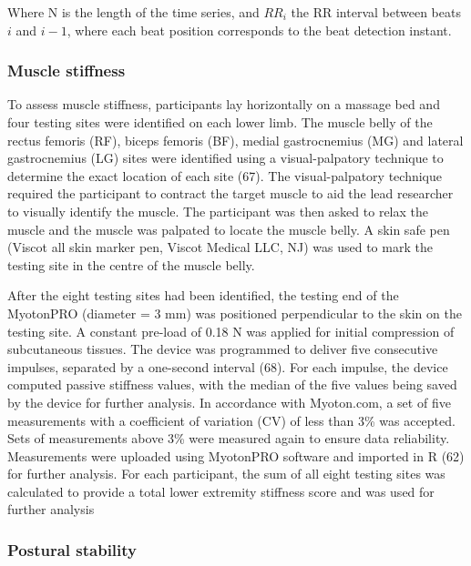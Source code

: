 \documentclass[
  english,
  man]{apa6}
\begin{document}
Where N is the length of the time series, and \(RR_i\) the RR interval between beats \(i\) and \(i-1\), where each beat position corresponds to the beat detection instant.

\hypertarget{muscle-stiffness}{%
\subsubsection{Muscle stiffness}\label{muscle-stiffness}}

To assess muscle stiffness, participants lay horizontally on a massage bed and four testing sites were identified on each lower limb.
The muscle belly of the rectus femoris (RF), biceps femoris (BF), medial gastrocnemius (MG) and lateral gastrocnemius (LG) sites were identified using a visual-palpatory technique to determine the exact location of each site (67).
The visual-palpatory technique required the participant to contract the target muscle to aid the lead researcher to visually identify the muscle.
The participant was then asked to relax the muscle and the muscle was palpated to locate the muscle belly.
A skin safe pen (Viscot all skin marker pen, Viscot Medical LLC, NJ) was used to mark the testing site in the centre of the muscle belly.

After the eight testing sites had been identified, the testing end of the MyotonPRO (diameter = 3 mm) was positioned perpendicular to the skin on the testing site.
A constant pre-load of 0.18 N was applied for initial compression of subcutaneous tissues.
The device was programmed to deliver five consecutive impulses, separated by a one-second interval (68).
For each impulse, the device computed passive stiffness values, with the median of the five values being saved by the device for further analysis.
In accordance with Myoton.com, a set of five measurements with a coefficient of variation (CV) of less than 3\% was accepted.
Sets of measurements above 3\% were measured again to ensure data reliability.
Measurements were uploaded using MyotonPRO software and imported in R (62) for further analysis.
For each participant, the sum of all eight testing sites was calculated to provide a total lower extremity stiffness score and was used for further analysis

\hypertarget{postural-stability-1}{%
\subsubsection{Postural stability}\label{postural-stability-1}}
\end{document}
